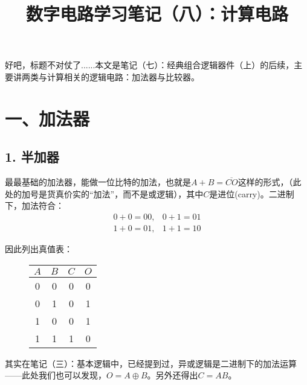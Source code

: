 \documentclass[UTF8]{ctexart}
\title{数字电路学习笔记（八）：计算电路}
\begin{document}
\maketitle

好吧，标题不对仗了......本文是笔记（七）：经典组合逻辑器件（上）的后续，主要讲两类与计算相关的逻辑电路：加法器与比较器。

\section*{一、加法器}

\subsection*{1. 半加器}

最最基础的加法器，能做一位比特的加法，也就是$A+B=\overline{CO}$这样的形式，（此处的加号是货真价实的“加法”，而不是或逻辑），其中$C$是进位(carry)。二进制下，加法符合：
\[\begin{matrix} 0+0=00,&0+1=01\\ 1+0=01,&1+1=10 \end{matrix}\]

因此列出真值表：
\begin{figure}
    \begin{tabular}{|c|c|c|c|}\hline\rowcolor{lightgray}
        $A$&$B$&$C$&$O$\\\hline
        0&0&0&0\\\hline
        0&1&0&1\\\hline
        1&0&0&1\\\hline
        1&1&1&0\\\hline
    \end{tabular}
\end{figure}

其实在笔记（三）：基本逻辑中，已经提到过，异或逻辑是二进制下的加法运算——此处我们也可以发现，$O=A\oplus B$。另外还得出$C=AB$。
\end{document}
